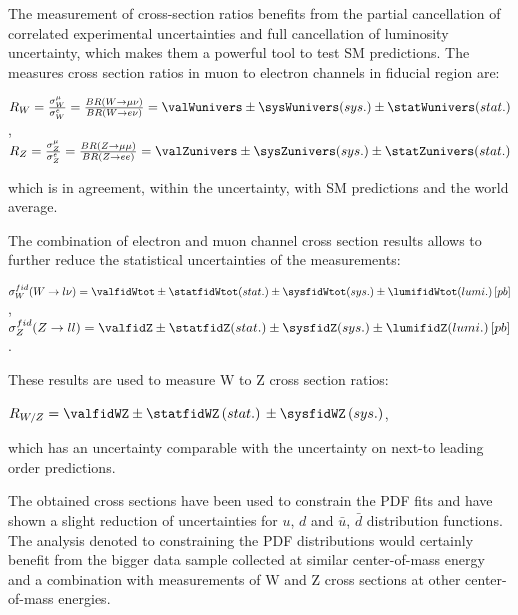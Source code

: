 \newpage

The measurement of cross-section ratios benefits from the partial cancellation of correlated experimental uncertainties and full cancellation of luminosity uncertainty, which makes them a powerful tool to test SM predictions. The measures cross section ratios in muon to electron channels in fiducial region  are:
\begin{center}
$R_{W}=\frac{\sigma^{\mu}_W}{\sigma^{e}_W} = \frac{BR(\wmunu)}{BR(\wenu)}= \valWunivers \pm \sysWunivers (sys.) \pm \statWunivers (stat.)$,\\
$R_{Z}=\frac{\sigma^{\mu}_Z}{\sigma^{e}_Z} = \frac{BR(Z\to \mu\mu)}{BR(Z \to ee)}= \valZunivers \pm \sysZunivers(sys.) \pm \statZunivers (stat.)$
\end{center}
which is in agreement, within the uncertainty, with SM predictions and the world average. 


The combination of electron and muon channel cross section results allows to further reduce the statistical uncertainties of the measurements: 
\begin{center}
$\sigma^{fid}_{W}(W \to l\nu) =  \valfidWtot \pm \statfidWtot (stat.) \pm \sysfidWtot (sys.) \pm \lumifidWtot (lumi.) \, [pb]$, \\
$\sigma^{fid}_{Z}(Z \to ll) = \valfidZ \pm \statfidZ (stat.) \pm \sysfidZ  (sys.) \pm \lumifidZ (lumi.) \, [pb]$. \\
\end{center}
These results are used to measure W to Z cross section ratios:
\begin{center}
$R_{W/Z} = \valfidWZ \pm \statfidWZ \, (stat.)\, \pm \sysfidWZ\, (sys.)$,\\
\end{center}
which has an uncertainty comparable with the uncertainty on next-to leading order predictions. 

The obtained cross sections have been used to constrain the PDF fits and have shown a slight reduction of uncertainties for $u$, $d$ and $\bar{u}$, $\bar{d}$ distribution functions. The analysis denoted to constraining the PDF distributions would certainly benefit from the bigger data sample collected at similar center-of-mass energy and a combination with measurements of W and Z cross sections at other center-of-mass energies.



